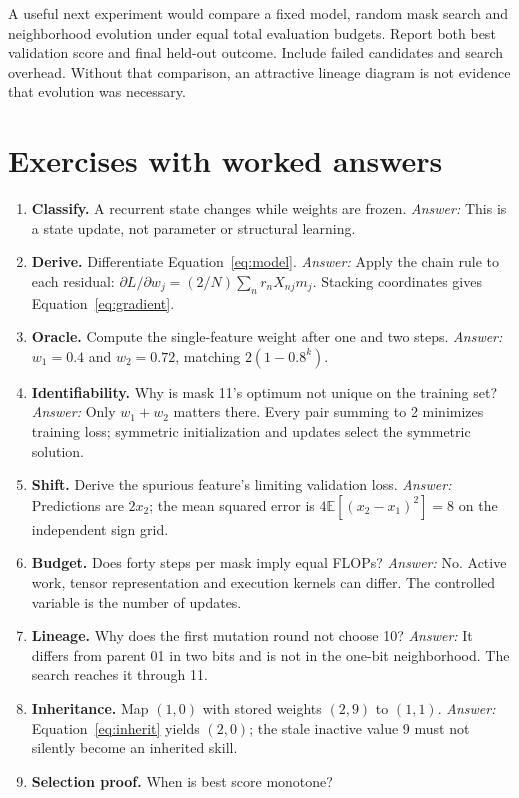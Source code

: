 A useful next experiment would compare a fixed model, random mask search
and neighborhood evolution under equal total evaluation budgets.
Report both best validation score and final held-out outcome. Include failed
candidates and search overhead. Without that comparison, an attractive
lineage diagram is not evidence that evolution was necessary.

\section{Exercises with worked answers}
\begin{enumerate}
\item \textbf{Classify.} A recurrent state changes while weights are frozen.
\textit{Answer:} This is a state update, not parameter or structural learning.
\item \textbf{Derive.} Differentiate Equation~\ref{eq:model}.
\textit{Answer:} Apply the chain rule to each residual:
$\partial L/\partial w_j=(2/N)\sum_nr_nX_{nj}m_j$.
Stacking coordinates gives Equation~\ref{eq:gradient}.
\item \textbf{Oracle.} Compute the single-feature weight after one and two
steps. \textit{Answer:} $w_1=0.4$ and $w_2=0.72$,
matching $2(1-0.8^k)$.
\item \textbf{Identifiability.} Why is mask 11's optimum not unique on the
training set? \textit{Answer:} Only $w_1+w_2$ matters there. Every pair
summing to 2 minimizes training loss; symmetric initialization and updates
select the symmetric solution.
\item \textbf{Shift.} Derive the spurious feature's limiting validation loss.
\textit{Answer:} Predictions are $2x_2$; the mean squared error is
$4\mathbb E[(x_2-x_1)^2]=8$ on the independent sign grid.
\item \textbf{Budget.} Does forty steps per mask imply equal FLOPs?
\textit{Answer:} No. Active work, tensor representation and execution kernels
can differ. The controlled variable is the number of updates.
\item \textbf{Lineage.} Why does the first mutation round not choose 10?
\textit{Answer:} It differs from parent 01 in two bits and is not in the
one-bit neighborhood. The search reaches it through 11.
\item \textbf{Inheritance.} Map $(1,0)$ with stored weights $(2,9)$ to $(1,1)$.
\textit{Answer:} Equation~\ref{eq:inherit} yields $(2,0)$;
the stale inactive value 9 must not silently become an inherited skill.
\item \textbf{Selection proof.} When is best score monotone?

\end{enumerate}
